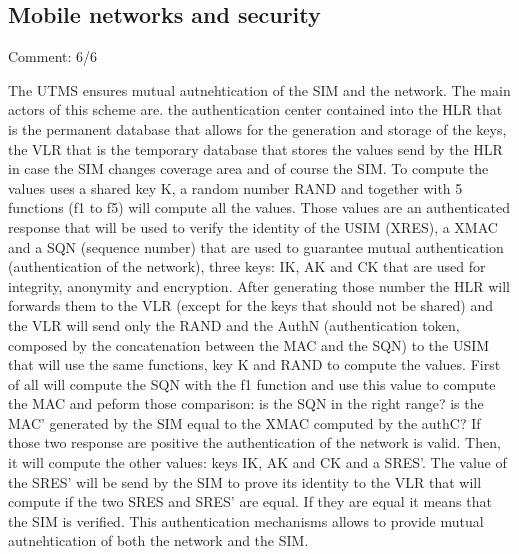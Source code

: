 \subsection{Mobile networks and security}


\begin{solution}
    Comment: 6/6

    The UTMS ensures mutual autnehtication of the SIM and the network. The main actors of this scheme are. the authentication center contained into the HLR that is the permanent database that allows for the generation and storage of the keys, the VLR that is the temporary database that stores the values send by the HLR in case the SIM changes coverage area and of course the SIM.
    To compute the values uses a shared key K, a random number RAND and together with 5 functions (f1 to f5) will compute all the values. Those values are an authenticated response that will be used to verify the identity of the USIM (XRES), a XMAC and a SQN (sequence number) that are used to guarantee mutual authentication (authentication of the network), three keys: IK, AK and CK that are used for integrity, anonymity and encryption. After generating those number the HLR will forwards them to the VLR (except for the keys that should not be shared) and the VLR will send only the RAND and the AuthN (authentication token, composed by the concatenation between the MAC and the SQN) to the USIM that will use the same functions, key K and RAND to compute the values. First of all will compute the SQN with the f1 function and use this value to compute the MAC and peform those comparison: is the SQN in the right range? is the MAC' generated by the SIM equal to the XMAC computed by the authC? If those two response are positive the authentication of the network is valid. Then, it will compute the other values: keys IK, AK and CK and a SRES'. The value of the SRES' will be send by the SIM to prove its identity to the VLR that will compute if the two SRES and SRES' are equal. If they are equal it means that the SIM is verified. This authentication mechanisms allows to provide mutual autnehtication of both the network and the SIM.

\end{solution}

